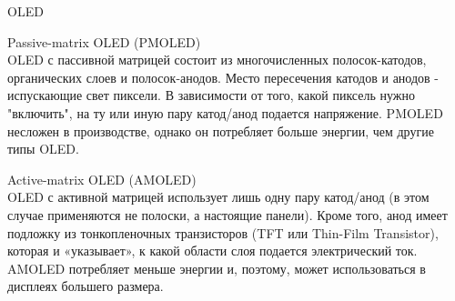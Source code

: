 \documentclass{beamer}
\begin{document}
\begin{frame}{OLED}
{			\vspace{0.15cm}
			Passive-matrix OLED (PMOLED)\\
			OLED с пассивной матрицей состоит из многочисленных полосок-катодов, органических слоев и полосок-анодов.
			Место пересечения катодов и анодов - испускающие свет пиксели. 
			В зависимости от того, какой пиксель нужно "включить", на ту или иную пару катод/анод подается напряжение. 
			PMOLED несложен в производстве, однако он потребляет больше энергии, чем другие типы OLED. 

			\vspace{0.15cm}
			Active-matrix OLED (AMOLED)\\
			OLED с активной матрицей использует лишь одну пару катод/анод (в этом случае применяются не полоски, а настоящие панели). 
			Кроме того, анод имеет подложку из тонкопленочных транзисторов (TFT или Thin-Film Transistor), которая и «указывает», к какой области слоя подается электрический ток. 
			AMOLED потребляет меньше энергии и, поэтому, может использоваться в дисплеях большего размера. 

		}

			
	\end{frame}


			

\end{document}
